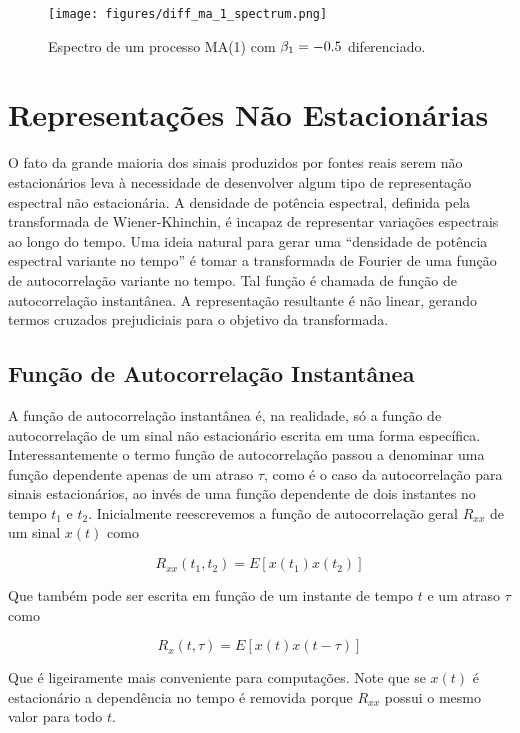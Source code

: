 \begin{figure}[H]
    \centering
    \texttt{[image: figures/diff\_ma\_1\_spectrum.png]}
    \caption{Espectro de um processo MA(1) com $\protect \beta_1 = -0.5$
    diferenciado.}
    \label{fig:diff_ma_1_spectrum}
\end{figure}

\section{Representações Não Estacionárias}

O fato da grande maioria dos sinais produzidos por fontes reais serem não
estacionários leva à necessidade de desenvolver algum tipo de representação
espectral não estacionária. A densidade de potência espectral, definida pela
transformada de Wiener-Khinchin, é incapaz de representar variações espectrais
ao longo do tempo. Uma ideia natural para gerar uma ``densidade de potência
espectral variante no tempo'' é tomar a transformada de Fourier de uma função
de autocorrelação variante no tempo. Tal função é chamada de função de
autocorrelação instantânea. A representação resultante é não linear, gerando
termos cruzados prejudiciais para o objetivo da transformada.

\subsection{Função de Autocorrelação Instantânea}\label{ssec:inst_autocorr}

A função de autocorrelação instantânea é, na realidade, só a função de
autocorrelação de um sinal não estacionário escrita em uma forma específica.
Interessantemente o termo função de autocorrelação passou a denominar uma
função dependente apenas de um atraso $\tau$, como é o caso da autocorrelação
para sinais estacionários, ao invés de uma função dependente de dois
instantes no tempo $t_1$ e $t_2$. Inicialmente reescrevemos a função de
autocorrelação geral $R_{xx}$ de um sinal $x(t)$ como

$$ R_{xx}(t_1, t_2) = E[x(t_1)x(t_2)] $$

Que também pode ser escrita em função de um instante de tempo $t$ e um atraso
$\tau$ como

$$ R_{x}(t, \tau) = E[x(t)x(t-\tau)] $$

Que é ligeiramente mais conveniente para computações. Note que se $x(t)$ é
estacionário a dependência no tempo é removida porque $R_{xx}$ possui o
mesmo valor para todo $t$.

